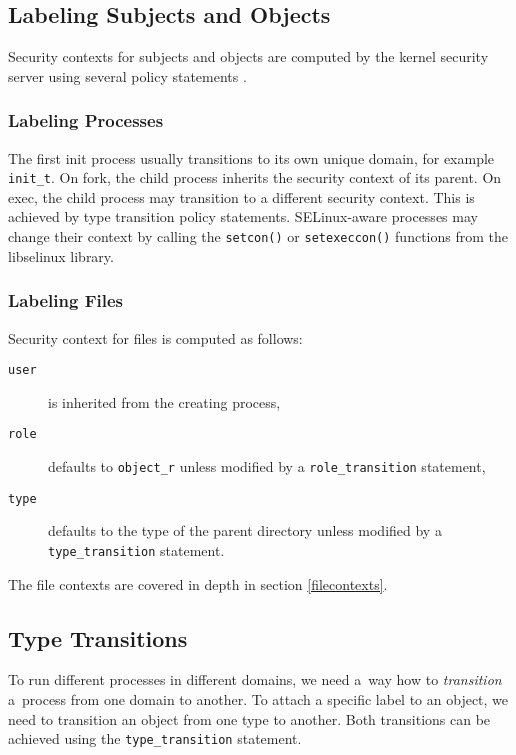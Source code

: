 \subsection{Labeling Subjects and Objects}
Security contexts for subjects and objects are computed by the kernel security
server using several policy statements \cite[pp.~31--33]{tsn}.

\subsubsection{Labeling Processes}
The first init process usually transitions to its own unique domain, for example
\texttt{init\_t}. On fork, the child process inherits the security context of
its parent. On exec, the child process may transition to a different security
context. This is achieved by type transition policy statements. SELinux-aware
processes may change their context by calling the \texttt{setcon()} or
\texttt{setexeccon()} functions from the libselinux library.

\subsubsection{Labeling Files}
Security context for files is computed as follows:
\begin{description}
    \item [\texttt{user}] is inherited from the creating process,
    \item [\texttt{role}] defaults to \texttt{object\_r} unless modified by a
        \texttt{role\_transition} statement,
    \item [\texttt{type}] defaults to the type of the parent directory unless
        modified by a \texttt{type\_transition} statement.
\end{description}
The file contexts are covered in depth in section \ref{filecontexts}.

\subsection{Type Transitions}
\label{typetransitions}
To run different processes in different domains, we need a~way how to
\emph{transition} a~process from one domain to another. To attach a specific
label to an object, we need to transition an object from one type to another.
Both transitions can be achieved using the \texttt{type\_transition} statement.

